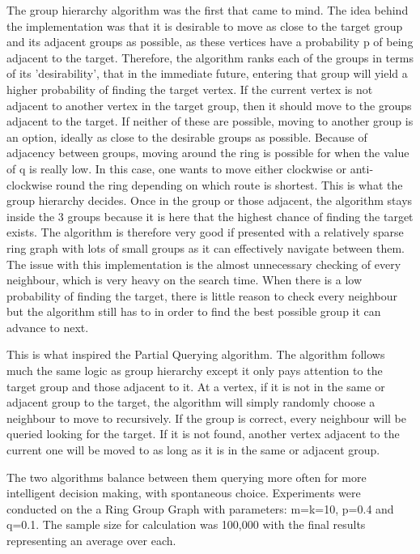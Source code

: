 \documentclass[12pt,a4paper]{article}
\begin{document}
The group hierarchy algorithm was the first that came to mind. The idea behind the implementation was that it is desirable to move as close to the target group and its adjacent groups as possible, as these vertices have a probability p of being adjacent to the target. Therefore, the algorithm ranks each of the groups in terms of its 'desirability', that in the immediate future, entering that group will yield a higher probability of finding the target vertex. If the current vertex is not adjacent to another vertex in the target group, then it should move to the groups adjacent to the target. If neither of these are possible, moving to another group is an option, ideally as close to the desirable groups as possible. Because of adjacency between groups, moving around the ring is possible for when the value of q is really low. In this case, one wants to move either clockwise or anti-clockwise round the ring depending on which route is shortest. This is what the group hierarchy decides. Once in the group or those adjacent, the algorithm stays inside the 3 groups because it is here that the highest chance of finding the target exists. The algorithm is therefore very good if presented with a relatively sparse ring graph with lots of small groups as it can effectively navigate between them. The issue with this implementation is the almost unnecessary checking of every neighbour, which is very heavy on the search time. When there is a low probability of finding the target, there is little reason to check every neighbour but the algorithm still has to in order to find the best possible group it can advance to next.

This is what inspired the Partial Querying algorithm. The algorithm follows much the same logic as group hierarchy except it only pays attention to the target group and those adjacent to it. At a vertex, if it is not in the same or adjacent group to the target, the algorithm will simply randomly choose a neighbour to move to recursively. If the group is correct, every neighbour will be queried looking for the target. If it is not found, another vertex adjacent to the current one will be moved to as long as it is in the same or adjacent group.

The two algorithms balance between them querying more often for more intelligent decision making, with spontaneous choice. Experiments were conducted on the a Ring Group Graph with parameters: m=k=10, p=0.4 and q=0.1. The sample size for calculation was 100,000 with the final results representing an average over each.
\end{document}
